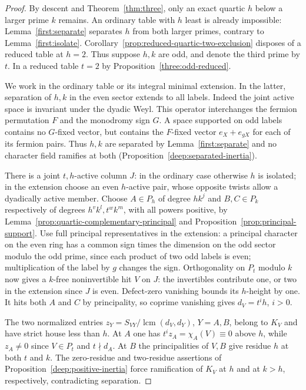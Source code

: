 \documentclass[11pt,a4paper]{article}
\numberwithin{equation}{section}
\theoremstyle{remark}
\newcommand{\lcm}{\operatorname{lcm}}
\begin{document}
\begin{proof}
By descent and Theorem~\ref{thm:three}, only an exact quartic $h$
below a larger prime $k$ remains. An ordinary table with $h$ least
is already impossible: Lemma~\ref{first:separate} separates $h$
from both larger primes, contrary to Lemma~\ref{first:isolate}.
Corollary~\ref{prop:reduced-quartic-two-exclusion} disposes of a
reduced table at $h=2$. Thus suppose $h,k$ are odd, and denote the
third prime by $t$. In a reduced table $t=2$ by
Proposition~\ref{three:odd-reduced}.

We work in the ordinary table or its integral minimal extension.
In the latter, separation of $h,k$ in the even sector extends to all
labels. Indeed the joint active space is invariant under the dyadic
Weyl. This operator interchanges the fermion permutation $F$ and the
monodromy sign $G$. A space supported on odd labels contains no
$G$-fixed vector, but contains the $F$-fixed vector $e_X+e_{gX}$
for each of its fermion pairs. Thus $h,k$ are separated by
Lemma~\ref{first:separate} and no character field ramifies at both
(Proposition~\ref{deep:separated-inertia}).

There is a joint $t,h$-active column $J$: in the ordinary case
otherwise $h$ is isolated; in the extension choose an even $h$-active
pair, whose opposite twists allow a dyadically active member.
Choose $A\in P_h$ of degree $hk^j$ and $B,C\in P_k$ respectively of
degrees $h^v k^l,t^w k^m$, with all powers positive, by Lemma~\ref{prop:quartic-complementary-principal} and Proposition~\ref{prop:principal-support}. Use full principal representatives in the extension:
a principal character on the even ring has a common sign times the
dimension on the odd sector modulo the odd prime, since each product
of two odd labels is even; multiplication of the label by $g$ changes
the sign. Orthogonality on $P_t$ modulo $k$ now gives a $k$-free
noninvertible hit $V$ on $J$: the invertibles contribute one, or two
in the extension since $J$ is even. Defect-zero vanishing bounds its
$h$-height by one. It hits both $A$ and $C$ by principality, so
coprime vanishing gives $d_V=t^i h$, $i>0$.

The two normalized entries $z_Y=S_{VY}/\lcm(d_V,d_Y)$,
$Y=A,B$, belong to $K_V$ and have strict house less than $h$.
At $A$ one has $t^i z_A=\chi_A(V)\equiv0$ above $h$, while
$z_A\ne0$ since $V\in P_t$ and $t\nmid d_A$. At $B$ the
principalities of $V,B$ give residue $h$ at both $t$ and $k$.
The zero-residue and two-residue assertions of
Proposition~\ref{deep:positive-inertia} force ramification of $K_V$
at $h$ and at $k>h$, respectively, contradicting separation.
\end{proof}
\end{document}
